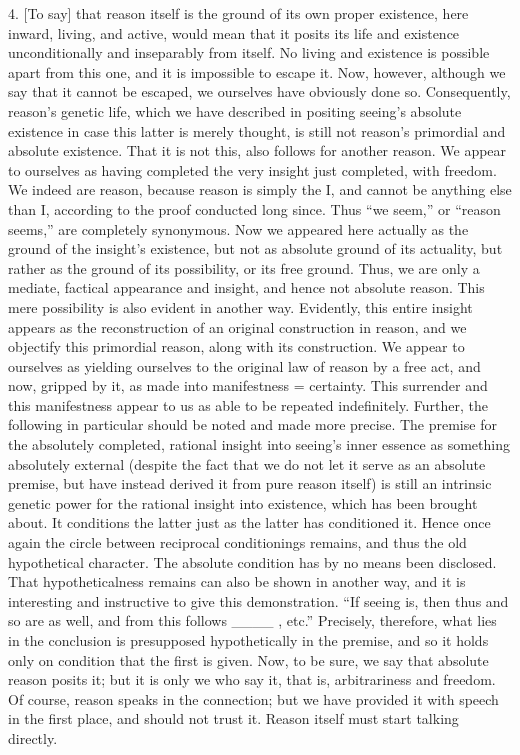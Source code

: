 4. [To say] that reason itself is
the ground of its own proper existence,
here inward, living, and active,
would mean that it posits its life and existence
unconditionally and inseparably from itself.
No living and existence is possible apart from this one,
and it is impossible to escape it.
Now, however, although we say that it cannot be escaped,
we ourselves have obviously done so.
Consequently, reason’s genetic life,
which we have described in
positing seeing’s absolute existence
in case this latter is merely thought,
is still not reason’s primordial
and absolute existence.
That it is not this,
also follows for another reason.
We appear to ourselves as
having completed the very insight
just completed, with freedom.
We indeed are reason,
because reason is simply the I,
and cannot be anything else than I,
according to the proof conducted long since.
Thus “we seem,” or “reason seems,”
are completely synonymous.
Now we appeared here actually as
the ground of the insight’s existence,
but not as absolute ground of its actuality,
but rather as the ground of its possibility,
or its free ground.
Thus, we are only a mediate,
factical appearance and insight,
and hence not absolute reason.
This mere possibility is
also evident in another way.
Evidently, this entire insight appears as
the reconstruction of an original construction in reason,
and we objectify this primordial reason,
along with its construction.
We appear to ourselves as yielding ourselves
to the original law of reason by a free act,
and now, gripped by it, as made into manifestness = certainty.
This surrender and this manifestness appear to us
as able to be repeated indefinitely.
Further, the following in particular
should be noted and made more precise.
The premise for the absolutely completed,
rational insight into seeing’s inner essence
as something absolutely external
(despite the fact that we do not
let it serve as an absolute premise,
but have instead derived it from pure reason itself)
is still an intrinsic genetic power
for the rational insight into existence,
which has been brought about.
It conditions the latter just as
the latter has conditioned it.
Hence once again the circle
between reciprocal conditionings remains,
and thus the old hypothetical character.
The absolute condition has by no means been disclosed.
That hypotheticalness remains can also be shown in another way,
and it is interesting and instructive to give this demonstration.
“If seeing is, then thus and so are as well,
and from this follows ____ , etc.”
Precisely, therefore, what lies in the conclusion is
presupposed hypothetically in the premise,
and so it holds only on condition that the first is given.
Now, to be sure, we say that absolute reason posits it;
but it is only we who say it, that is, arbitrariness and freedom.
Of course, reason speaks in the connection;
but we have provided it with speech in the first place,
and should not trust it.
Reason itself must start talking directly.

